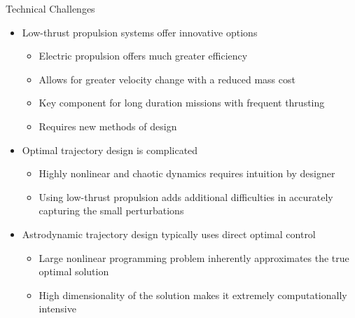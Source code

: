 \documentclass[final, usenames, dvipsnames]{beamer}
\newlength{\onecolwidth}
\begin{document}
\begin{frame}[t]
\begin{columns}[T]
\begin{column}{\onecolwidth}
\begin{block}{Technical Challenges}
	\begin{itemize}
		\item Low-thrust propulsion systems offer innovative options
		\begin{itemize}
			\item Electric propulsion offers much greater efficiency
			\item Allows for greater velocity change with a reduced mass cost
			\item Key component for long duration missions with frequent thrusting
			\item Requires new methods of design
		\end{itemize}
		\item Optimal trajectory design is complicated
		\begin{itemize}
			\item Highly nonlinear and chaotic dynamics requires intuition by designer
			\item Using low-thrust propulsion adds additional difficulties in accurately capturing the small perturbations
		\end{itemize}
		\item Astrodynamic trajectory design typically uses direct optimal control
		\begin{itemize}
			\item Large nonlinear programming problem inherently approximates the true optimal solution
			\item High dimensionality of the solution makes it extremely computationally intensive
		\end{itemize}
	\end{itemize}
\end{block} 


\end{column}
\end{columns}
\end{frame}
\end{document}
